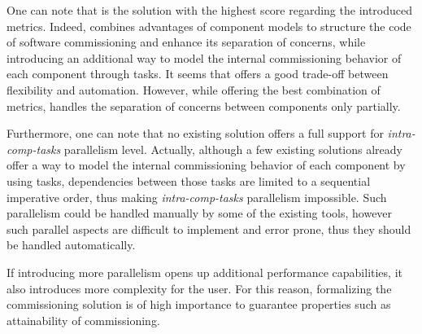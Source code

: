 One can note that \aeolus is the solution with the highest score regarding the introduced metrics. Indeed, \aeolus combines advantages of component models to structure the code of software commissioning and enhance its separation of concerns, while introducing an additional way to model the internal commissioning behavior of each component through tasks. It seems that \aeolus offers a good trade-off between flexibility and automation. However, while offering the best combination of metrics, \aeolus handles the separation of concerns between components only partially.

Furthermore, one can note that no existing solution offers a full support for \emph{intra-comp-tasks} parallelism level. Actually, although a few existing solutions already offer a way to model the internal commissioning behavior of each component by using tasks, dependencies between those tasks are limited to a sequential imperative order, thus making \emph{intra-comp-tasks} parallelism impossible. Such parallelism could be handled manually by some of the existing tools, however such parallel aspects are difficult to implement and error prone, thus they should be handled automatically.

If introducing more parallelism opens up additional performance capabilities, it also introduces more complexity for the user. For this reason, formalizing the commissioning solution is of high importance to guarantee properties such as attainability of commissioning.


